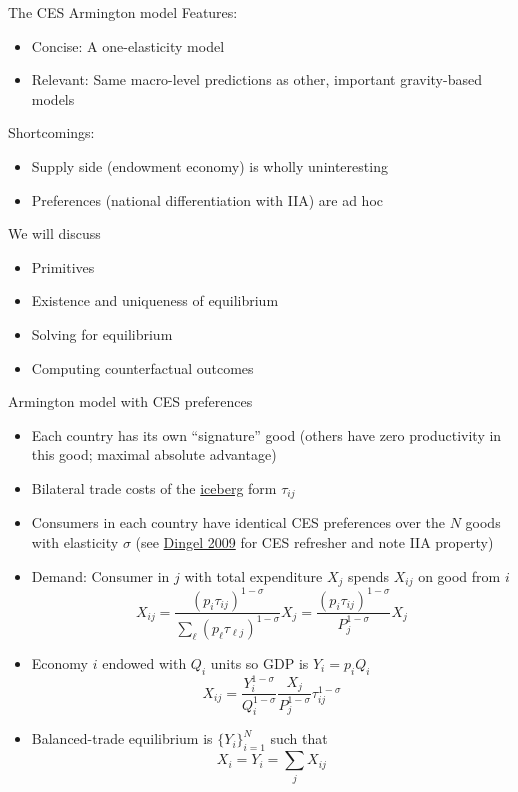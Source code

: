 \documentclass[10pt,notes=hide,aspectratio=169]{beamer}
\begin{document}
\begin{frame}{The CES Armington model}
Features:
\begin{itemize}
\item Concise: A one-elasticity model
\item Relevant: Same macro-level predictions as other, important gravity-based models
\end{itemize}
Shortcomings:
\begin{itemize}
\item Supply side (endowment economy) is wholly uninteresting 
\item Preferences (national differentiation with IIA) are ad hoc
\end{itemize}
We will discuss
\begin{itemize}
\item Primitives
\item Existence and uniqueness of equilibrium
\item Solving for equilibrium
\item Computing counterfactual outcomes
\end{itemize}
\end{frame}
\begin{frame}{Armington model with CES preferences}
\begin{itemize}
	\item Each country has its own ``signature'' good (others have zero productivity in this good; maximal absolute advantage)
	\item Bilateral trade costs of the \href{https://tradediversion.net/2019/10/28/whats-an-iceberg-commuting-cost/}{iceberg} form $\tau_{ij}$
	\item Consumers in each country have identical CES preferences over the $N$ goods with elasticity $\sigma$
	(see \href{http://www.columbia.edu/~jid2106/td/dixitstiglitzbasics.pdf}{Dingel 2009} for CES refresher and note IIA property)
	\item Demand: Consumer in $j$ with total expenditure $X_j$ spends $X_{ij}$ on good from $i$
	\begin{equation*}
	X_{ij}	= \frac{(p_i\tau_{ij} )^{1-\sigma}}{\sum_{\ell} (p_\ell\tau_{\ell j})^{1-\sigma}} X_j
			= \frac{(p_i\tau_{ij} )^{1-\sigma}}{P_j^{1-\sigma}} X_j
	\end{equation*}
	\item Economy $i$ endowed with $Q_i$ units so GDP is $Y_i = p_i Q_i$
	\begin{equation*}
	X_{ij}	= \frac{Y_i^{1-\sigma}}{Q_i^{1-\sigma}} \frac{X_j}{P_j^{1-\sigma}}\tau_{ij}^{1-\sigma}
	\end{equation*}
	\item Balanced-trade equilibrium is $\{Y_i\}_{i=1}^{N}$ such that 
	\begin{equation*}
	X_i = Y_i = \sum_j X_{ij}
	\end{equation*}
\end{itemize}
\end{frame}
\end{document}
